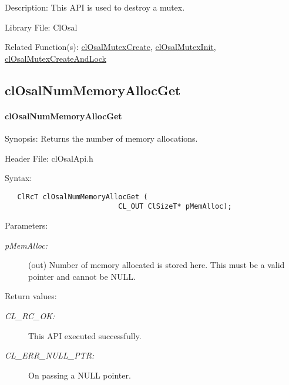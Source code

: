 \begin{Desc}
\item[Description:]This API is used to destroy a mutex.\end{Desc}
\begin{Desc}
\item[Library File:]Cl\-Osal\end{Desc}
\begin{Desc}
\item[Related Function(s):]\hyperlink{pageosal111}{cl\-Osal\-Mutex\-Create}, \hyperlink{pageosal155}{cl\-Osal\-Mutex\-Init}, 
\hyperlink{pageosal112}{cl\-Osal\-Mutex\-Create\-And\-Lock}\end{Desc}




\newpage
\subsection{clOsalNumMemoryAllocGet}
\hypertarget{pageosal116}{}\paragraph{cl\-Osal\-Num\-Memory\-Alloc\-Get}\label{pageosal116}
\begin{Desc}
\item[Synopsis:]Returns the number of memory allocations.\end{Desc}
\begin{Desc}
\item[Header File:]clOsalApi.h\end{Desc}
\begin{Desc}
\item[Syntax:]

\footnotesize\begin{verbatim}   ClRcT clOsalNumMemoryAllocGet (
                           CL_OUT ClSizeT* pMemAlloc);
\end{verbatim}
\normalsize
\end{Desc}
\begin{Desc}
\item[Parameters:]
\begin{description}
\item[{\em p\-Mem\-Alloc:}](out) Number of memory allocated is stored here. This must be a valid pointer and cannot be NULL.\end{description}
\end{Desc}
\begin{Desc}
\item[Return values:]
\begin{description}
\item[{\em CL\_\-RC\_\-OK:}]This API executed successfully. \item[{\em CL\_\-ERR\_\-NULL\_\-PTR:}]On passing a NULL pointer.\end{description}
\end{Desc}
